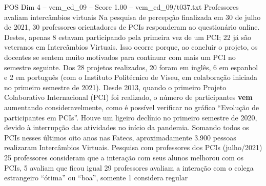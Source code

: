 \begin{textsample}{POS Dim 4 – vem\_ed\_09 – Score 1.00 – vem\_ed\_09/t037.txt}  \label{ex:f4_pos_160}
Professores avaliam intercâmbios virtuais Na pesquisa de percepção finalizada em 30 de julho de 2021, 30 professores orientadores de PCIs responderam ao questionário online.
Destes, apenas 8 estavam participando pela primeira vez de um PCI; 22 já são veteranos em Intercâmbios Virtuais.
Isso ocorre porque, ao concluir o projeto, os docentes se sentem muito motivados para continuar com mais um PCI no semestre seguinte.
Dos 28 projetos realizados, 20 foram em inglês, 6 em espanhol e 2 em português (com o Instituto Politécnico de Viseu, em colaboração iniciada no primeiro semestre de 2021).
Desde 2013, quando o primeiro Projeto Colaborativo Internacional (PCI) foi realizado, o número de participantes \textbf{vem} aumentando consideravelmente, como é possível verificar no gráfico “Evolução de participantes em PCIs”.
Houve um ligeiro declínio no primeiro semestre de 2020, devido à interrupção das atividades no início da pandemia.
Somando todos os PCIs nesses últimos oito anos nas Fatecs, aproximadamente 3.900 pessoas realizaram Intercâmbios Virtuais.
Pesquisa com professores dos PCIs (julho/2021) 25 professores consideram que a interação com seus alunos melhorou com os PCIs, 5 avaliam que ficou igual 29 professores avaliam a interação com o colega estrangeiro “ótima” ou “boa”, somente 1 considera regular

\end{textsample}
